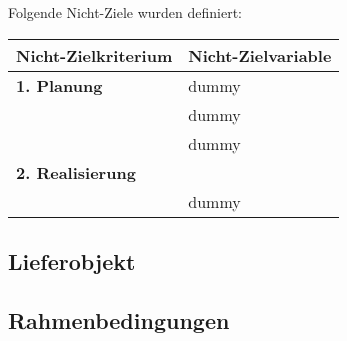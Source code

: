 Folgende Nicht-Ziele wurden definiert:
\begin{table}[H]
\small
\begin{tabular}{ll}
\hline
\textbf{Nicht-Zielkriterium}				&\textbf{Nicht-Zielvariable}											\\
\hline
\rowcolor{hellgrau}
\textbf{1. Planung}						&	dummy																\\
										&dummy											\\
										&dummy								\\	
\rowcolor{hellgrau}
\textbf{2. Realisierung}					&																	\\
										&dummy								\\
\hline
\end{tabular}
\end{table}

\subsection{Lieferobjekt} \label{subsec:lieferobjekt}

\subsection{Rahmenbedingungen} \label{subsec:rahmenbedingungen}